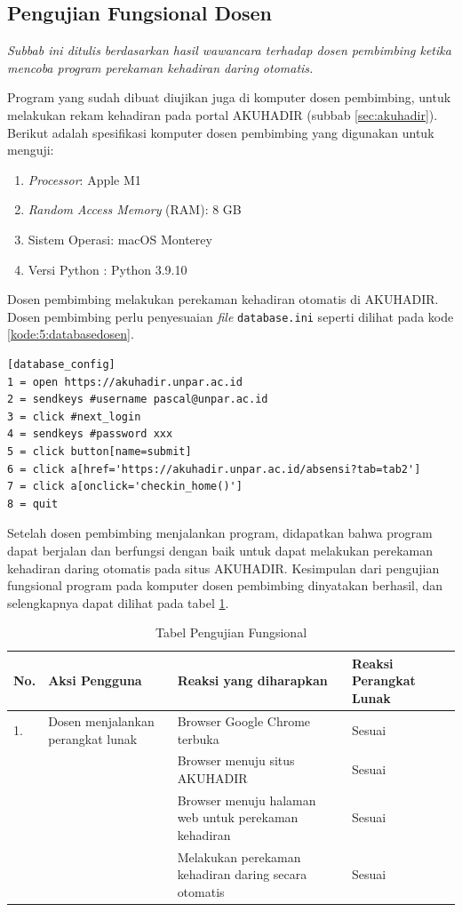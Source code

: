 \subsection{Pengujian Fungsional Dosen}

\textit{Subbab ini ditulis berdasarkan hasil wawancara terhadap dosen pembimbing ketika mencoba program perekaman kehadiran daring otomatis.}

Program yang sudah dibuat diujikan juga di komputer dosen pembimbing, untuk melakukan rekam kehadiran pada portal AKUHADIR (subbab \ref{sec:akuhadir}). Berikut adalah spesifikasi komputer dosen pembimbing yang digunakan untuk menguji:

\begin{enumerate}
	\item \textit{Processor}: Apple M1
	\item \textit{Random Access Memory} (RAM): 8 GB
	\item Sistem Operasi: macOS Monterey
	\item Versi Python : Python 3.9.10
\end{enumerate}

Dosen pembimbing melakukan perekaman kehadiran otomatis di AKUHADIR. Dosen pembimbing perlu penyesuaian \textit{file} \texttt{database.ini} seperti dilihat pada kode \ref{kode:5:databasedosen}.

\begin{lstlisting}[caption=\textit{File} \texttt{database.ini} AKUHADIR (\textit{password} disembunyikan), label=kode:5:databasedosen]
[database_config]
1 = open https://akuhadir.unpar.ac.id
2 = sendkeys #username pascal@unpar.ac.id
3 = click #next_login
4 = sendkeys #password xxx
5 = click button[name=submit]
6 = click a[href='https://akuhadir.unpar.ac.id/absensi?tab=tab2']
7 = click a[onclick='checkin_home()']
8 = quit
\end{lstlisting}


Setelah dosen pembimbing menjalankan program, didapatkan bahwa program dapat berjalan dan berfungsi dengan baik untuk dapat melakukan perekaman kehadiran daring otomatis pada situs AKUHADIR. Kesimpulan dari pengujian fungsional program pada komputer dosen pembimbing dinyatakan berhasil, dan selengkapnya dapat dilihat pada tabel \ref{tab:fungsidosen}.

\begin{table}[H]			
	\caption{Tabel Pengujian Fungsional}
	\centering
	\begin{tabular}{|p{0.5cm} |p{4cm} |p{5.5cm}| p{3cm}|} \hline
		No. & Aksi Pengguna & Reaksi yang diharapkan & Reaksi Perangkat Lunak\\ \hline     
		1. & Dosen menjalankan perangkat lunak & Browser Google Chrome terbuka & Sesuai\\ \hline 
		 	& &  Browser menuju situs AKUHADIR & Sesuai\\ \hline
		 	& &  Browser menuju halaman web untuk perekaman kehadiran & Sesuai\\ \hline
		 	& &  Melakukan perekaman kehadiran daring secara otomatis & Sesuai\\ \hline
	\end{tabular}
	\label{tab:fungsidosen}
\end{table}

